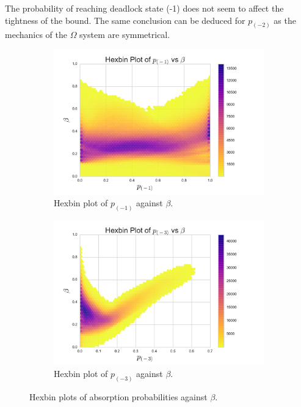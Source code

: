 \documentclass{article}
\numberwithin{equation}{section}
\begin{document}
The probability of reaching deadlock state (-1) does not seem to affect the
tightness of the bound.
The same conclusion can be deduced for $p_{(-2)}$ as the mechanics of the
$\Omega$ system are symmetrical.

\begin{figure}[!htbp]
\begin{subfigure}[b]{0.5\textwidth}
  \includegraphics[width=\textwidth]{images/hexbin-1}
  \caption{Hexbin plot of $p_{(-1)}$ against $\beta$.}
  \label{fig:hexbin_p1}
\end{subfigure}
\begin{subfigure}[b]{0.5\textwidth}
  \includegraphics[width=\textwidth]{images/hexbin-3}
  \caption{Hexbin plot of $p_{(-3)}$ against $\beta$.}
  \label{fig:hexbin_p3}
\end{subfigure}
\caption{Hexbin plots of absorption probabilities against $\beta$.}
\label{fig:hexbinplot_ratio_analysis}
\end{figure}
\end{document}
